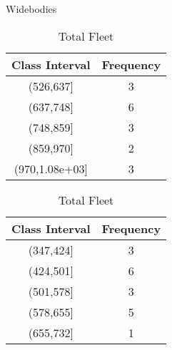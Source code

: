 \begin{table}[H]
    \centering
    \begin{minipage}{0.45\textwidth}
        \centering
        \caption*{Widebodies}
        \begin{tabular}{|c|c|}
            \hline
            Class Interval & Frequency \\
            \hline
            (526,637]      & 3         \\
            (637,748]      & 6         \\
            (748,859]      & 3         \\
            (859,970]      & 2         \\
            (970,1.08e+03] & 3         \\
            \hline
        \end{tabular}
    \end{minipage}%
    \hspace{0.05\textwidth} %
    \begin{minipage}{0.45\textwidth}
        \centering
        \caption*{Total Fleet}
        \begin{tabular}{|c|c|}
            \hline
            Class Interval & Frequency \\
            \hline
            (347,424]      & 3         \\
            (424,501]      & 6         \\
            (501,578]      & 3         \\
            (578,655]      & 5         \\
            (655,732]      & 1         \\
            \hline
        \end{tabular}
    \end{minipage}
\end{table}
